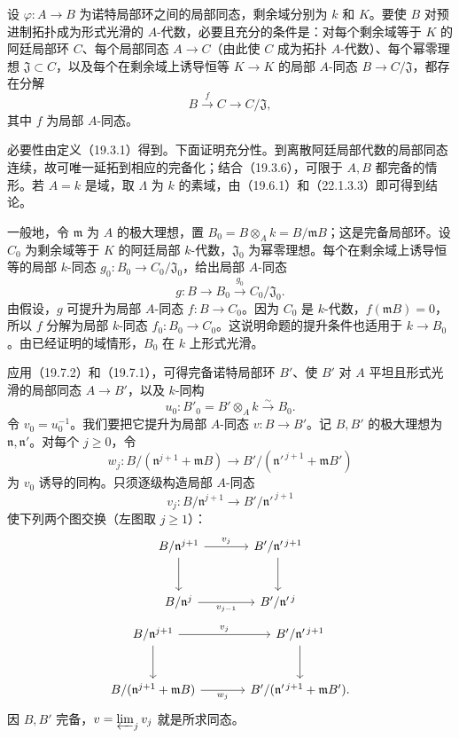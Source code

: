设 $\varphi:A\to B$ 为诺特局部环之间的局部同态，剩余域分别为 $k$ 和 $K$。要使 $B$ 对预进制拓扑成为形式光滑的 $A$-代数，必要且充分的条件是：对每个剩余域等于 $K$ 的阿廷局部环 $C$、每个局部同态 $A\to C$（由此使 $C$ 成为拓扑 $A$-代数）、每个幂零理想 $\mathfrak J\subset C$，以及每个在剩余域上诱导恒等 $K\to K$ 的局部 $A$-同态 $B\to C/\mathfrak J$，都存在分解
\[
 B\xrightarrow{f}C\longrightarrow C/\mathfrak J,
\]
其中 $f$ 为局部 $A$-同态。

\eproof
必要性由定义（19.3.1）得到。下面证明充分性。到离散阿廷局部代数的局部同态连续，故可唯一延拓到相应的完备化；结合（19.3.6），可限于 $A,B$ 都完备的情形。若 $A=k$ 是域，取 $\Lambda$ 为 $k$ 的素域，由（19.6.1）和（22.1.3.3）即可得到结论。

一般地，令 $\mathfrak m$ 为 $A$ 的极大理想，置 $B_0=B\otimes_A k=B/\mathfrak mB$；这是完备局部环。设 $C_0$ 为剩余域等于 $K$ 的阿廷局部 $k$-代数，$\mathfrak J_0$ 为幂零理想。每个在剩余域上诱导恒等的局部 $k$-同态 $g_0:B_0\to C_0/\mathfrak J_0$，给出局部 $A$-同态
\[
 g:B\longrightarrow B_0\xrightarrow{g_0}C_0/\mathfrak J_0.
\]
由假设，$g$ 可提升为局部 $A$-同态 $f:B\to C_0$。因为 $C_0$ 是 $k$-代数，$f(\mathfrak mB)=0$，所以 $f$ 分解为局部 $k$-同态 $f_0:B_0\to C_0$。这说明命题的提升条件也适用于 $k\to B_0$。由已经证明的域情形，$B_0$ 在 $k$ 上形式光滑。

应用（19.7.2）和（19.7.1），可得完备诺特局部环 $B'$、使 $B'$ 对 $A$ 平坦且形式光滑的局部同态 $A\to B'$，以及 $k$-同构
\[
 u_0:B'_0=B'\otimes_A k\xrightarrow{\sim}B_0.
\]
令 $v_0=u_0^{-1}$。我们要把它提升为局部 $A$-同态 $v:B\to B'$。记 $B,B'$ 的极大理想为 $\mathfrak n,\mathfrak n'$。对每个 $j\ge0$，令
\[
 w_j:B/(\mathfrak n^{j+1}+\mathfrak mB)
 \longrightarrow B'/(\mathfrak n'^{\,j+1}+\mathfrak mB')
\]
为 $v_0$ 诱导的同构。只须逐级构造局部 $A$-同态
\[
 v_j:B/\mathfrak n^{j+1}\longrightarrow B'/\mathfrak n'^{\,j+1}
\]
使下列两个图交换（左图取 $j\ge1$）：
\[
\begin{tikzcd}[column sep=large,row sep=large]
 B/\mathfrak n^{j+1}\arrow[r,"v_j"]\arrow[d]&
 B'/\mathfrak n'^{\,j+1}\arrow[d]\\
 B/\mathfrak n^j\arrow[r,"v_{j-1}"']&B'/\mathfrak n'^{\,j}
\end{tikzcd}
\]
\[
\begin{tikzcd}[column sep=large,row sep=large]
 B/\mathfrak n^{j+1}\arrow[r,"v_j"]\arrow[d]&
 B'/\mathfrak n'^{\,j+1}\arrow[d]\\
 B/(\mathfrak n^{j+1}+\mathfrak mB)\arrow[r,"w_j"']&
 B'/(\mathfrak n'^{\,j+1}+\mathfrak mB').
\end{tikzcd}
\]
因 $B,B'$ 完备，$v=\varprojlim_jv_j$ 就是所求同态。

